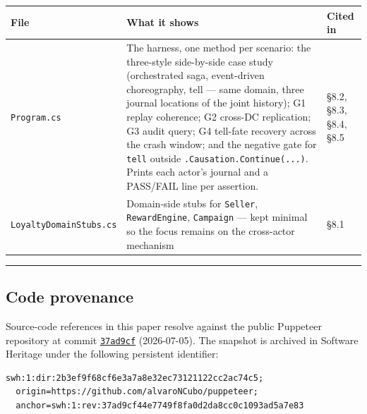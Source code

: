 \documentclass[
]{article}
\newcounter{none} %
\let\origtexttt\texttt%
\renewcommand{\texttt}[1]{\origtexttt{\seqsplit{#1}}}%
\let\texttt\origtexttt%
\begin{document}
{\def\LTcaptype{none} %
\begin{longtable}[]{@{}
  >{\raggedright\arraybackslash}p{}
  >{\raggedright\arraybackslash}p{}
  >{\raggedright\arraybackslash}p{}@{}}
\toprule\noalign{}
\begin{minipage}[b]{\linewidth}\raggedright
File
\end{minipage} & \begin{minipage}[b]{\linewidth}\raggedright
What it shows
\end{minipage} & \begin{minipage}[b]{\linewidth}\raggedright
Cited in
\end{minipage} \\
\midrule\noalign{}
\endhead
\bottomrule\noalign{}
\endlastfoot
\texttt{Program.cs} & The harness, one method per scenario: the
three-style side-by-side case study (orchestrated saga, event-driven
choreography, tell --- same domain, three journal locations of the joint
history); G1 replay coherence; G2 cross-DC replication; G3 audit query;
G4 tell-fate recovery across the crash window; and the negative gate for
\texttt{tell} outside \texttt{.Causation.Continue(...)}. Prints each
actor's journal and a PASS/FAIL line per assertion. & §8.2, §8.3, §8.4,
§8.5 \\
\texttt{LoyaltyDomainStubs.cs} & Domain-side stubs for \texttt{Seller},
\texttt{RewardEngine}, \texttt{Campaign} --- kept minimal so the focus
remains on the cross-actor mechanism & §8.1 \\
\end{longtable}
}

\begin{center}\rule{0.5\linewidth}{0.5pt}\end{center}

\subsection{Code provenance}\label{code-provenance}

Source-code references in this paper resolve against the public
Puppeteer repository at commit
\href{https://github.com/alvaroNCubo/puppeteer/tree/37ad9cf44e7749f8fa0d2da8cc0c1093ad5a7e83}{\texttt{37ad9cf}}
(2026-07-05). The snapshot is archived in Software Heritage under the
following persistent identifier:

\begin{verbatim}
swh:1:dir:2b3ef9f68cf6e3a7a8e32ec73121122cc2ac74c5;
  origin=https://github.com/alvaroNCubo/puppeteer;
  anchor=swh:1:rev:37ad9cf44e7749f8fa0d2da8cc0c1093ad5a7e83
\end{verbatim}
\end{document}
